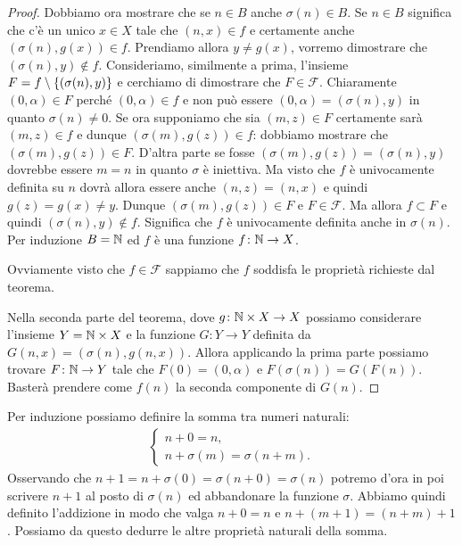 \begin{proof}
Dobbiamo ora mostrare che se $n\in B$ anche $\sigma(n)\in B$.
Se $n\in B$ significa che c'è un unico $x\in X$ tale che $(n,x)\in f$
e certamente anche $(\sigma(n),g(x))\in f$.
Prendiamo allora $y\neq g(x)$, vorremo dimostrare che $(\sigma(n),y)\not \in f$.
Consideriamo, similmente a prima, l'insieme $F=f\setminus{\left\{ (\sigma(n),y) \right\}}$
e cerchiamo di dimostrare che $F\in \mathcal F$.
Chiaramente $(0,\alpha)\in F$ perché $(0,\alpha)\in f$ 
e non può essere $(0,\alpha)=(\sigma(n),y)$ in quanto $\sigma(n)\neq 0$.
Se ora supponiamo che sia $(m,z)\in F$ certamente sarà $(m,z)\in f$ 
e dunque $(\sigma(m),g(z))\in f$: 
dobbiamo mostrare che $(\sigma(m),g(z))\in F$. 
D'altra parte se fosse $(\sigma(m), g(z))=(\sigma(n),y)$ 
dovrebbe essere $m=n$ in quanto $\sigma$ è iniettiva. 
Ma visto che $f$ è univocamente definita su $n$ dovrà allora essere 
anche $(n,z) = (n,x)$ e quindi $g(z)=g(x) \neq y$. 
Dunque $(\sigma(m),g(z))\in F$ e $F\in \mathcal F$.
Ma allora $f\subset F$ e quindi $(\sigma(n),y)\not \in f$.
Significa che $f$ è univocamente definita anche in $\sigma(n)$.
Per induzione $B=\mathbb N$ ed $f$ è una funzione $f\colon \mathbb N\to X$.

Ovviamente visto che $f\in \mathcal F$ sappiamo che $f$ 
soddisfa le proprietà richieste dal teorema.

Nella seconda parte del teorema, dove $g\colon \mathbb N\times X \to X$
possiamo considerare l'insieme $Y=\mathbb N\times X$ e la funzione 
$G\colon Y\to Y$ definita da $G(n,x) = (\sigma(n), g(n,x))$.
Allora applicando la prima parte possiamo trovare $F\colon \mathbb N\to Y$
tale che $F(0) = (0,\alpha)$ e $F(\sigma(n)) = G(F(n))$.
Basterà prendere come $f(n)$ la seconda componente di $G(n)$.
\end{proof}
  
Per induzione possiamo definire la somma tra numeri naturali:
\begin{align*}
\begin{cases}
    n + 0 = n, \\ 
    n + \sigma(m) = \sigma(n+m).
\end{cases}
\end{align*}
Osservando che $n+1 = n+\sigma(0) = \sigma(n+0) = \sigma(n)$
potremo d'ora in poi scrivere $n+1$ al posto di $\sigma(n)$ 
ed abbandonare la funzione $\sigma$.
Abbiamo quindi definito l'addizione in modo 
che valga $n+0=n$ e $n+(m+1) = (n+m)+1$.
Possiamo da questo dedurre le altre proprietà naturali della somma.

